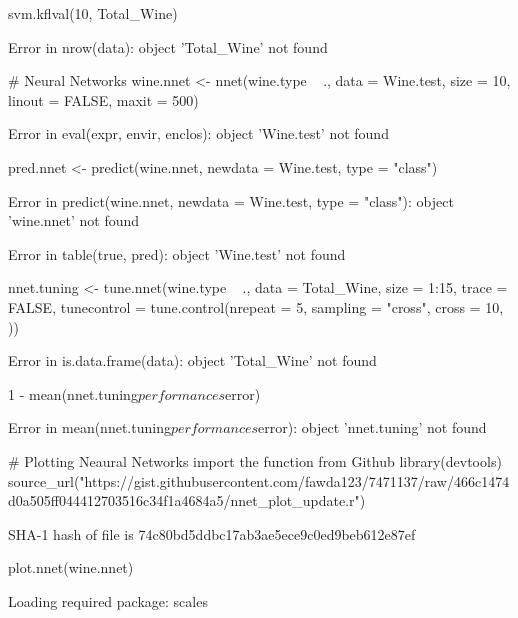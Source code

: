 \documentclass[letterpaper]{article}\usepackage[]{graphicx}\usepackage[]{color}
\begin{document}
\begin{Schunk}
\begin{Sinput}
svm.kflval(10, Total_Wine)
\end{Sinput}
\begin{Soutput}
Error in nrow(data): object 'Total_Wine' not found
\end{Soutput}
\begin{Sinput}
# Neural Networks
wine.nnet <- nnet(wine.type ~ ., data = Wine.test, size = 10, linout = FALSE, 
    maxit = 500)
\end{Sinput}
\begin{Soutput}
Error in eval(expr, envir, enclos): object 'Wine.test' not found
\end{Soutput}
\begin{Sinput}
pred.nnet <- predict(wine.nnet, newdata = Wine.test, type = "class")
\end{Sinput}
\begin{Soutput}
Error in predict(wine.nnet, newdata = Wine.test, type = "class"): object 'wine.nnet' not found
\end{Soutput}
\begin{Soutput}
Error in table(true, pred): object 'Wine.test' not found
\end{Soutput}
\begin{Sinput}
nnet.tuning <- tune.nnet(wine.type ~ ., data = Total_Wine, size = 1:15, trace = FALSE, 
    tunecontrol = tune.control(nrepeat = 5, sampling = "cross", cross = 10, 
        ))
\end{Sinput}
\begin{Soutput}
Error in is.data.frame(data): object 'Total_Wine' not found
\end{Soutput}
\begin{Sinput}
1 - mean(nnet.tuning$performances$error)
\end{Sinput}
\begin{Soutput}
Error in mean(nnet.tuning$performances$error): object 'nnet.tuning' not found
\end{Soutput}
\begin{Sinput}
# Plotting Neaural Networks import the function from Github
library(devtools)
source_url("https://gist.githubusercontent.com/fawda123/7471137/raw/466c1474d0a505ff044412703516c34f1a4684a5/nnet_plot_update.r")
\end{Sinput}
\begin{Soutput}
SHA-1 hash of file is 74c80bd5ddbc17ab3ae5ece9c0ed9beb612e87ef
\end{Soutput}
\begin{Sinput}
plot.nnet(wine.nnet)
\end{Sinput}
\begin{Soutput}
Loading required package: scales
\end{Soutput}
\begin{Soutput}


\end{Soutput}
\end{Schunk}
\end{document}
